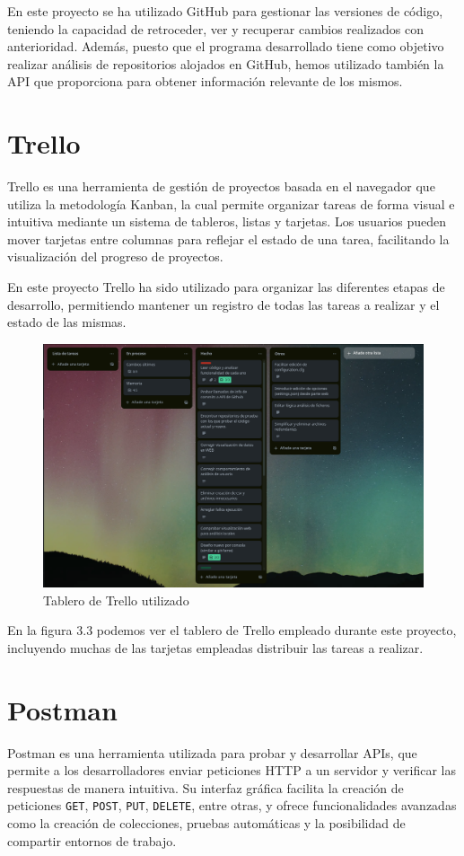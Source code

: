 \documentclass[a4paper, 12pt]{book}
\begin{document}
En este proyecto se ha utilizado GitHub para gestionar las versiones de código, teniendo la capacidad de retroceder, ver y recuperar cambios realizados con anterioridad. Además, puesto que el programa desarrollado tiene como objetivo realizar análisis de repositorios alojados en GitHub, hemos utilizado también la API que proporciona para obtener información relevante de los mismos.

\section{Trello}
Trello es una herramienta de gestión de proyectos basada en el navegador que utiliza la metodología Kanban, la cual permite organizar tareas de forma visual e intuitiva mediante un sistema de tableros, listas y tarjetas. Los usuarios pueden mover tarjetas entre columnas para reflejar el estado de una tarea, facilitando la visualización del progreso de proyectos.

En este proyecto Trello ha sido utilizado para organizar las diferentes etapas de desarrollo, permitiendo mantener un registro de todas las tareas a realizar y el estado de las mismas. 

\begin{figure} [H]
    \centering
    \includegraphics[width=\linewidth]{img/trello_example.png}
    \caption{Tablero de Trello utilizado}
    \label{fig:trello_example}
\end{figure}

En la figura 3.3 podemos ver el tablero de Trello empleado durante este proyecto, incluyendo muchas de las tarjetas empleadas distribuir las tareas a realizar.

\section{Postman} 
Postman es una herramienta utilizada para probar y desarrollar APIs, que permite a los desarrolladores enviar peticiones HTTP a un servidor y verificar las respuestas de manera intuitiva. Su interfaz gráfica facilita la creación de peticiones \texttt{GET}, \texttt{POST}, \texttt{PUT}, \texttt{DELETE}, entre otras, y ofrece funcionalidades avanzadas como la creación de colecciones, pruebas automáticas y la posibilidad de compartir entornos de trabajo.
\end{document}
